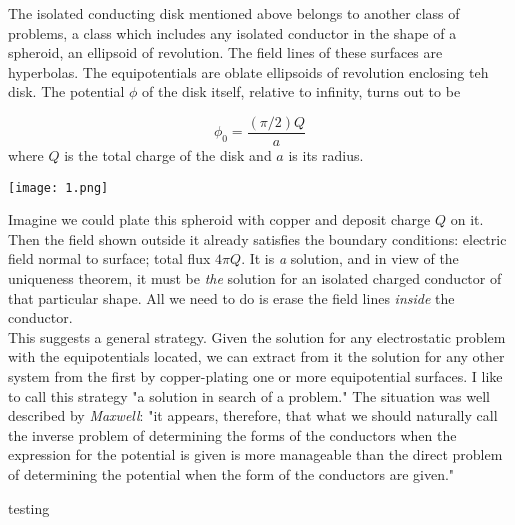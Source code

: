 \documentclass[svgnames]{article}
\begin{document}
The isolated conducting disk mentioned above belongs to another class of
problems, a class which includes any isolated conductor in the shape of
a spheroid, an ellipsoid of revolution. The field lines of these surfaces are
hyperbolas. The equipotentials are oblate ellipsoids of revolution enclosing
teh disk. The potential $\phi$ of the disk itself, relative to infinity, turns
out to be 

\[
\phi_0 = \frac{(\pi / 2) Q}{a} 
\] 
where $Q$ is the total charge of the disk and $a$ is its radius. 

\begin{center}
\texttt{[image: 1.png]}
\end{center}

Imagine we could plate this spheroid with copper and deposit charge $Q$ on it.
Then the field shown outside it already satisfies the boundary conditions:
electric field normal to surface; total flux $4 \pi Q$. It is \textit{a}
solution, and in view of the uniqueness theorem, it must be \textit{the}
solution for an isolated charged conductor of that particular shape. All we
need to do is erase the field lines \textit{inside} the conductor. \\

This suggests a general strategy. Given the solution for any electrostatic
problem with the equipotentials located, we can extract from it the solution
for any other system from the first by copper-plating one or more
equipotential surfaces. I like to call this strategy "a solution in search 
of a problem." The situation was well described by \textit{Maxwell}: "it 
appears, therefore, that what we should naturally call the inverse problem 
of determining the forms of the conductors when the expression for the 
potential is given is more manageable than the direct problem of 
determining the potential when the form of the conductors are given." 

testing
\end{document}
